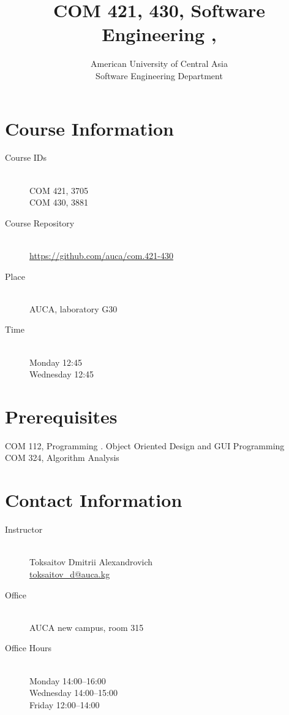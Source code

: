 \documentclass[12pt,a4paper,oneside]{article}
\newcommand{\R}[1]{\uppercase\expandafter{\romannumeral #1\relax}}
\begin{document}
    \title{COM 421, 430, Software Engineering \R{1}, \R{2}}
    \author{
        American University of Central Asia\\
        Software Engineering Department
    }
    \date{}
    \maketitle

    \section{Course Information}

        \begin{description}
            \item[Course IDs]\hfill\\
                COM 421, 3705\\
                COM 430, 3881
            \item[Course Repository]\hfill\\
                \url{https://github.com/auca/com.421-430}
            \item[Place]\hfill\\
                AUCA, laboratory G30
            \item[Time]\hfill\\
                Monday 12:45\\
                Wednesday 12:45
        \end{description}

    \section{Prerequisites}

        COM 112, Programming \R{2}. Object Oriented Design and GUI Programming\\
        COM 324, Algorithm Analysis

        \section{Contact Information}

            \begin{description}
                \item[Instructor]\hfill\\
                    Toksaitov Dmitrii Alexandrovich\\
                    \href{mailto:toksaitov_d@auca.kg}{toksaitov\_d@auca.kg}
                \item[Office]\hfill\\
                    AUCA new campus, room 315
                \item[Office Hours]\hfill\\
                    Monday 14:00--16:00\\
                    Wednesday 14:00--15:00\\
                    Friday 12:00--14:00
            \end{description}
\end{document}
